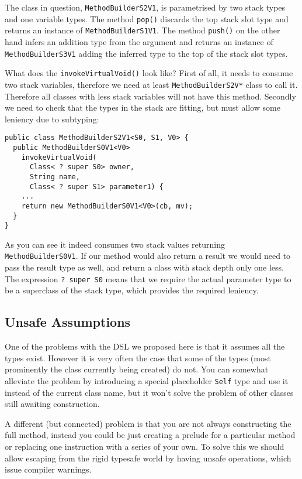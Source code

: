 \documentclass{sig-alternate}
\begin{document}
The class in question, \verb!MethodBuilderS2V1!, is parametrised by two stack types and one variable types. The method \verb!pop()! discards the top stack slot type and returns an instance of \verb!MethodBuilderS1V1!. The method \verb!push()! on the other hand infers an addition type from the argument and returns an instance of \verb!MethodBuilderS3V1! adding the inferred type to the top of the stack slot types.

What does the \verb!invokeVirtualVoid()! look like? First of all, it needs to consume two stack variables, therefore we need at least \verb!MethodBuilderS2V*! class to call it. Therefore all classes with less stack variables will not have this method. Secondly we need to check that the types in the stack are fitting, but must allow some leniency due to subtyping:

\begin{verbatim}
public class MethodBuilderS2V1<S0, S1, V0> {
  public MethodBuilderS0V1<V0> 
    invokeVirtualVoid(
      Class< ? super S0> owner, 
      String name, 
      Class< ? super S1> parameter1) {
    ...    
    return new MethodBuilderS0V1<V0>(cb, mv);
  }
}
\end{verbatim}

As you can see it indeed consumes two stack values returning \verb!MethodBuilderS0V1!. If our method would also return a result we would need to pass the result type as well, and return a class with stack depth only one less. The expression \verb!? super S0! means that we require the actual parameter type to be a superclass of the stack type, which provides the required leniency.

\subsection{Unsafe Assumptions}

One of the problems with the DSL we proposed here is that it assumes all the types exist. However it is very often the case that some of the types (most prominently the class currently being created) do not. You can somewhat alleviate the problem by introducing a special placeholder \verb!Self! type and use it instead of the current class name, but it won't solve the problem of other classes still awaiting construction.

A different (but connected) problem is that you are not always constructing the full method, instead you could be just creating a prelude for a particular method or replacing one instruction with a series of your own. To solve this we should allow escaping from the rigid typesafe world by having unsafe operations, which issue compiler warnings.
\end{document}
